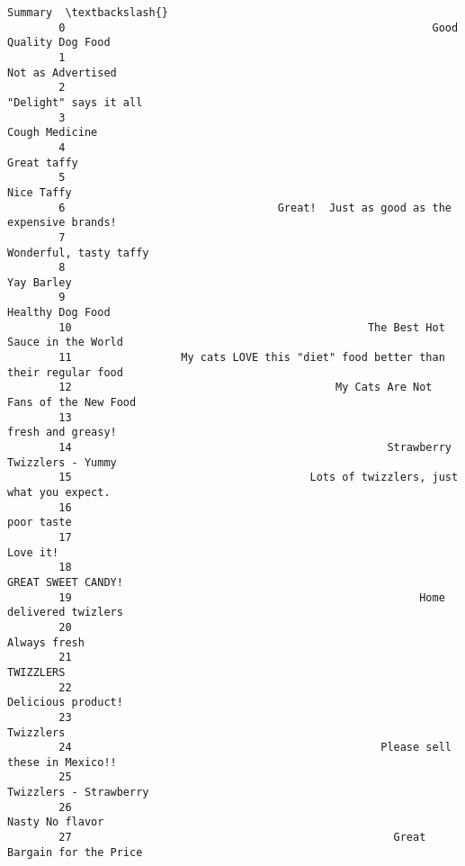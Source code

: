 \documentclass[11pt]{article}
\begin{document}
\begin{Verbatim}[commandchars=\\\{\}]
                                                                                Summary  \textbackslash{}
        0                                                         Good Quality Dog Food   
        1                                                             Not as Advertised   
        2                                                         "Delight" says it all   
        3                                                                Cough Medicine   
        4                                                                   Great taffy   
        5                                                                    Nice Taffy   
        6                                 Great!  Just as good as the expensive brands!   
        7                                                        Wonderful, tasty taffy   
        8                                                                    Yay Barley   
        9                                                              Healthy Dog Food   
        10                                              The Best Hot Sauce in the World   
        11                 My cats LOVE this "diet" food better than their regular food   
        12                                         My Cats Are Not Fans of the New Food   
        13                                                            fresh and greasy!   
        14                                                 Strawberry Twizzlers - Yummy   
        15                                     Lots of twizzlers, just what you expect.   
        16                                                                   poor taste   
        17                                                                     Love it!   
        18                                                           GREAT SWEET CANDY!   
        19                                                      Home delivered twizlers   
        20                                                                 Always fresh   
        21                                                                    TWIZZLERS   
        22                                                           Delicious product!   
        23                                                                    Twizzlers   
        24                                                Please sell these in Mexico!!   
        25                                                       Twizzlers - Strawberry   
        26                                                              Nasty No flavor   
        27                                                  Great Bargain for the Price   

\end{Verbatim}
\end{document}
